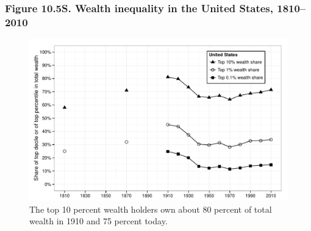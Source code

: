 \documentclass[t]{beamer}\usepackage[]{graphicx}\usepackage[]{color}
\newenvironment{knitrout}{}{} %
\begin{document}
\begin{frame}[label=Figure_10_5S]
\frametitle{Figure 10.5S. Wealth inequality in the United States, 1810--2010}
\begin{figure}[t]
\begin{minipage}[b]{\textwidth}
\centering
\begin{knitrout}\footnotesize
{}\color{fgcolor}

{\centering \includegraphics[width=1\linewidth]{figures/bw/Figure_10_5S} 

}



\end{knitrout}
\caption{The top 10 percent wealth holders own about 80 percent of total wealth in 1910 and 75 percent today.}
\end{minipage}
\end{figure}
\end{frame}
\end{document}
